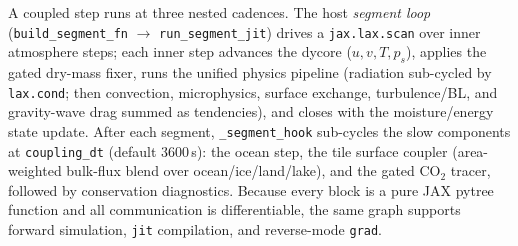 \documentclass[11pt,a4paper]{article}
\begin{document}
A coupled step runs at three nested cadences. The host \emph{segment loop}
(\texttt{build\_segment\_fn} $\to$ \texttt{run\_segment\_jit}) drives a
\texttt{jax.lax.scan} over inner atmosphere steps; each inner step advances the
dycore ($u,v,T,p_s$), applies the gated dry-mass fixer, runs the unified physics
pipeline (radiation sub-cycled by \texttt{lax.cond}; then convection,
microphysics, surface exchange, turbulence/BL, and gravity-wave drag summed as
tendencies), and closes with the moisture/energy state update. After each
segment, \texttt{\_segment\_hook} sub-cycles the slow components at
\texttt{coupling\_dt} (default 3600\,s): the ocean step, the tile surface coupler
(area-weighted bulk-flux blend over ocean/ice/land/lake), and the gated CO$_2$
tracer, followed by conservation diagnostics. Because every block is a pure JAX
pytree function and all communication is differentiable, the same graph supports
forward simulation, \texttt{jit} compilation, and reverse-mode \texttt{grad}.
\end{document}
